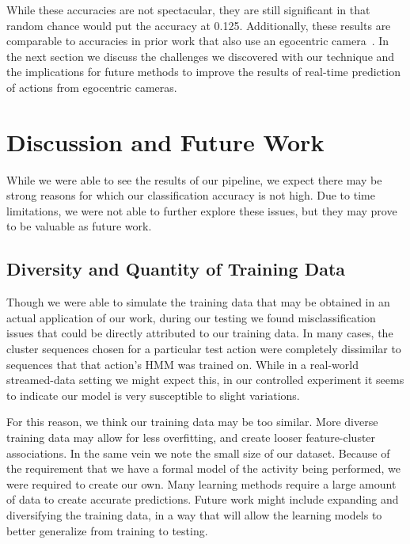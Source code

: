 \documentclass[10pt,twocolumn,letterpaper]{article}
\begin{document}

While these accuracies are not spectacular, they are still significant in that random chance would put the accuracy at 0.125. Additionally, these results are comparable to accuracies in prior work that also use an egocentric camera~\cite{TODO-RONAK}. In the next section we discuss the challenges we discovered with our technique and the implications for future methods to improve the results of real-time prediction of actions from egocentric cameras.

\section{Discussion and Future Work}

While we were able to see the results of our pipeline, we expect there may be strong reasons for which our classification accuracy is not high. Due to time limitations, we were not able to further explore these issues, but they may prove to be valuable as future work.

\subsection{Diversity and Quantity of Training Data}

Though we were able to simulate the training data that may be obtained in an actual application of our work, during our testing we found misclassification issues that could be directly attributed to our training data. In many cases, the cluster sequences chosen for a particular test action were completely dissimilar to sequences that that action's HMM was trained on. While in a real-world streamed-data setting we might expect this, in our controlled experiment it seems to indicate our model is very susceptible to slight variations.

For this reason, we think our training data may be too similar. More diverse training data may allow for less overfitting, and create looser feature-cluster associations. In the same vein we note the small size of our dataset. Because of the requirement that we have a formal model of the activity being performed, we were required to create our own. Many learning methods require a large amount of data to create accurate predictions. Future work might include expanding and diversifying the training data, in a way that will allow the learning models to better generalize from training to testing.
\end{document}
